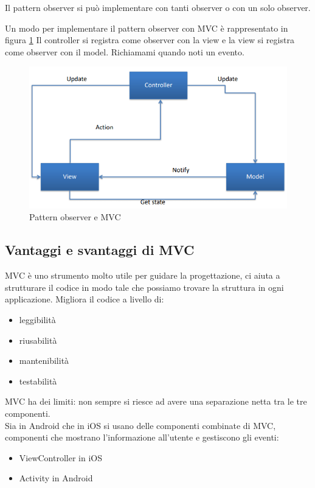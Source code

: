 Il pattern observer si può implementare con tanti observer o con un solo observer. 

Un modo per implementare il pattern observer con MVC è rappresentato in figura \ref{fig:pattern observer e MVC} 
Il controller si registra come observer con la view e la view si registra come observer con il model. Richiamami quando noti un evento.
\begin{figure}[!ht]
    \centering
    \includegraphics[width=.8\textwidth]{images/Mobile computing/6. Progettazione/observer e MVC.PNG}
    \caption{Pattern observer e MVC}
    \label{fig:pattern observer e MVC}
\end{figure}

\subsection{Vantaggi e svantaggi di MVC}
MVC è uno strumento molto utile per guidare la progettazione, ci aiuta a strutturare il codice in modo tale che possiamo trovare la struttura in ogni applicazione. 
Migliora il codice a livello di: 
\begin{itemize}
    \item leggibilità
    \item riusabilità
    \item mantenibilità
    \item testabilità
\end{itemize}

MVC ha dei limiti: non sempre si riesce ad avere una separazione netta tra le tre componenti.
\\ Sia in Android che in iOS si usano delle componenti combinate di MVC, componenti che mostrano l'informazione all'utente e gestiscono gli eventi:
\begin{itemize}
    \item ViewController in iOS
    \item Activity in Android
\end{itemize}

